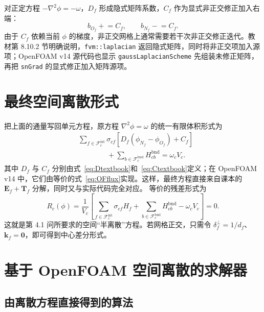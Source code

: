 \documentclass[UTF8,a4paper,11pt]{ctexart}
\newcommand{\vect}[1]{\bm{#1}}
\newcommand{\kf}{\vect k_f}
\begin{document}
对正定方程 \(-\nabla^2\phi=-\omega\)，\(D_f\) 形成隐式矩阵系数，\(C_f\) 作为显式非正交修正加入右端：
\begin{equation}
  b_{O_f}\mathrel{+}=C_f,
  \qquad
  b_{N_f}\mathrel{-}=C_f.
  \label{eq:Cassembly}
\end{equation}
由于 \(C_f\) 依赖当前 \(\phi\) 的梯度，非正交网格上通常需要若干次非正交修正迭代。教材第 8.10.2 节明确说明，\texttt{fvm::laplacian} 返回隐式矩阵，同时将非正交项加入源项\cite[第 8.10.2 节及代码清单 8.5--8.9]{Moukalled2016}；OpenFOAM v14 源代码也显示 \texttt{gaussLaplacianScheme} 先组装未修正矩阵，再把 \texttt{snGrad} 的显式修正加入矩阵源项\cite{OFfvmlap}。

\section{最终空间离散形式}

把上面的通量写回单元方程，原方程 \(\nabla^2\phi=\omega\) 的统一有限体积形式为
\begin{equation}
\boxed{
\begin{aligned}
  &\sum_{f\in\mathcal F_c^{\mathrm{int}}}
  \sigma_{cf}
  \left[D_f(\phi_{N_f}-\phi_{O_f})+C_f\right]\\
  &\hspace{4em}+
  \sum_{b\in\mathcal F_c^{\mathrm{bnd}}}
  H_{cb}^{\mathrm{bnd}}
  =\omega_cV_c .
\end{aligned}}
\label{eq:finaldiscrete}
\end{equation}
其中 \(D_f\) 与 \(C_f\) 分别由式~\eqref{eq:Dtextbook}和~\eqref{eq:Ctextbook}定义；在 OpenFOAM v14 中，它们由等价的式~\eqref{eq:OFflux}实现。这样，最终方程直接来自课本的 \(\vect E_f+\vect T_f\) 分解，同时又与实际代码完全对应。
等价的残差形式为
\begin{equation}
\boxed{
  R_c(\phi)=\frac{1}{V_c}
  \left[
  \sum_{f\in\mathcal F_c^{\mathrm{int}}}\sigma_{cf}H_f
  +\sum_{b\in\mathcal F_c^{\mathrm{bnd}}}H_{cb}^{\mathrm{bnd}}
  -\omega_cV_c
  \right]=0.}
\label{eq:finalres}
\end{equation}
这就是第 4.1 问所要求的空间“半离散”方程。若网格正交，只需令
\(\delta_f^{\perp}=1/d_f\)、\(\kf=\vect0\)，即可得到中心差分形式。

\section{基于 OpenFOAM 空间离散的求解器}

\subsection{由离散方程直接得到的算法}
\end{document}
